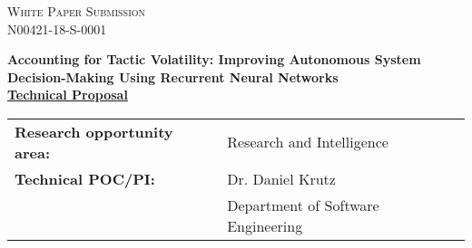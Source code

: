 \documentclass[12pt]{article}
\newcommand{\dan}[1]{\textcolor{blue}{{\it [Dan: #1]}}}
\newcommand{\Title}{Accounting for Tactic Volatility: Improving Autonomous System Decision-Making Using Recurrent Neural Networks}
\newcommand{\CallNumber}{N00421-18-S-0001} %
\newcommand{\CallName}{XXXX}
\begin{document}
\begin{titlepage}

\newcommand{\HRule}{\rule{\linewidth}{0.3mm}} %







\begin{center}
  \textsc{\Large White Paper Submission}\\[0.5cm] %
  \textsc{\large \CallNumber}\\[1.5cm]   %
\end{center}

\noindent \Large \textbf{\Title}\\[.10cm] 


\noindent \large  \underline{\textbf{Technical Proposal}}\\ [.15cm] 

\begin{tabular}{ L{50mm} L{100mm} }



\normalsize \textbf{Research opportunity area:} & \normalsize  Research and Intelligence  \\ 

\normalsize \textbf{Technical POC/PI:} & \normalsize  Dr. Daniel Krutz \\
 & \vspace{-2mm} \normalsize Department of Software Engineering
 \\


\end{tabular}
\end{titlepage}
\end{document}
